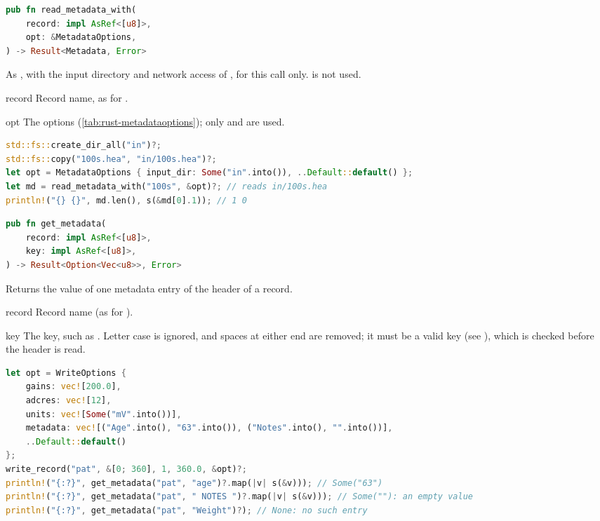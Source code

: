 \begin{lstlisting}[language=Rust,style=signature]
pub fn read_metadata_with(
    record: impl AsRef<[u8]>,
    opt: &MetadataOptions,
) -> Result<Metadata, Error>
\end{lstlisting}
As , with the input directory and network access of , for
this call only.  is not used.
\begin{params}
\item[record] Record name, as for .
\item[opt] The options (\cref{tab:rust-metadataoptions}); only  and
   are used.
\end{params}
\begin{lstlisting}[language=Rust,style=example]
std::fs::create_dir_all("in")?;
std::fs::copy("100s.hea", "in/100s.hea")?;
let opt = MetadataOptions { input_dir: Some("in".into()), ..Default::default() };
let md = read_metadata_with("100s", &opt)?; // reads in/100s.hea
println!("{} {}", md.len(), s(&md[0].1)); // 1 0
\end{lstlisting}

\begin{lstlisting}[language=Rust,style=signature]
pub fn get_metadata(
    record: impl AsRef<[u8]>,
    key: impl AsRef<[u8]>,
) -> Result<Option<Vec<u8>>, Error>
\end{lstlisting}
Returns the value of one metadata entry of the header of a record.
\begin{params}
\item[record] Record name (as for ).
\item[key] The key, such as . Letter case is ignored, and spaces at either end
  are removed; it must be a valid key (see ), which is checked before
  the header is read.
\end{params}
\begin{lstlisting}[language=Rust,style=example]
let opt = WriteOptions {
    gains: vec![200.0],
    adcres: vec![12],
    units: vec![Some("mV".into())],
    metadata: vec![("Age".into(), "63".into()), ("Notes".into(), "".into())],
    ..Default::default()
};
write_record("pat", &[0; 360], 1, 360.0, &opt)?;
println!("{:?}", get_metadata("pat", "age")?.map(|v| s(&v))); // Some("63")
println!("{:?}", get_metadata("pat", " NOTES ")?.map(|v| s(&v))); // Some(""): an empty value
println!("{:?}", get_metadata("pat", "Weight")?); // None: no such entry
\end{lstlisting}

